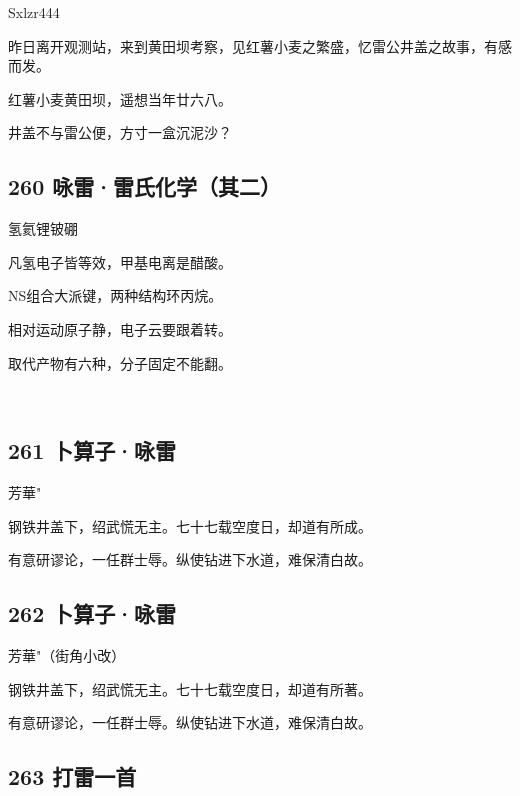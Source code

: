 {Sxlzr444}

昨日离开观测站，来到黄田坝考察，见红薯小麦之繁盛，忆雷公井盖之故事，有感而发。

红薯小麦黄田坝，遥想当年廿六八。

井盖不与雷公便，方寸一盒沉泥沙？

\hypertarget{ux548fux96f7ux96f7ux6c0fux5316ux5b66ux5176ux4e8c}{%
\subsection{260
咏雷·雷氏化学（其二）}\label{ux548fux96f7ux96f7ux6c0fux5316ux5b66ux5176ux4e8c}}

{氢氦锂铍硼}

凡氢电子皆等效，甲基电离是醋酸。

NS组合大派键，两种结构环丙烷。

相对运动原子静，电子云要跟着转。

取代产物有六种，分子固定不能翻。

~\\

\hypertarget{ux535cux7b97ux5b50ux548fux96f7}{%
\subsection{261 卜算子·咏雷}\label{ux535cux7b97ux5b50ux548fux96f7}}

{芳華"}

钢铁井盖下，绍武慌无主。七十七载空度日，却道有所成。

有意研谬论，一任群士辱。纵使钻进下水道，难保清白故。 ~\\

\hypertarget{ux535cux7b97ux5b50ux548fux96f7-1}{%
\subsection{262 卜算子·咏雷}\label{ux535cux7b97ux5b50ux548fux96f7-1}}

{芳華"（街角小改）}

钢铁井盖下，绍武慌无主。七十七载空度日，却道有所著。

有意研谬论，一任群士辱。纵使钻进下水道，难保清白故。 ~\\

\hypertarget{ux6253ux96f7ux4e00ux9996}{%
\subsection{263 打雷一首}\label{ux6253ux96f7ux4e00ux9996}}

